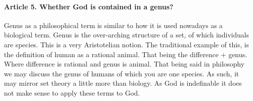 \documentclass{ucetd}
\begin{document}
\paragraph{Article 5. Whether God is contained in a genus?}
Genus as a philosophical term is similar to how it is used nowadays as a biological term. Genus is the over-arching structure of a set, of which individuals are species. This is a very Aristotelian notion. The traditional example of this, is the definition of human as a rational animal. That being the difference + genus. Where difference is rational and genus is animal. That being said in philosophy we may discuss the genus of humans of which you are one species. As such, it may mirror set theory a little more than biology. As God is indefinable it does not make sense to apply these terms to God.
\end{document}
